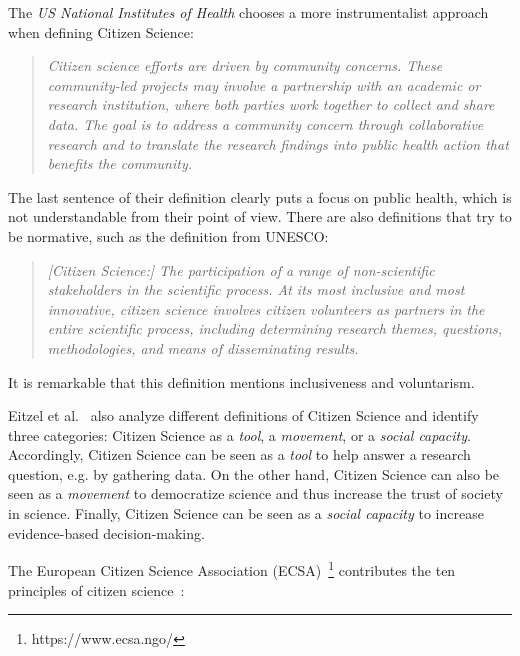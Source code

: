 The \textit{US National Institutes of Health} chooses a more instrumentalist approach when defining Citizen Science:
\begin{quote}
\textit{Citizen science efforts are driven by community concerns. These community-led projects may involve a partnership with an academic or research institution, where both parties work together to collect and share data. The goal is to address a community concern through collaborative research and to translate the research findings into public health action that benefits the community.}
\end{quote}
The last sentence of their definition clearly puts a focus on public health, which is not understandable from their point of view.
There are also definitions that try to be normative, such as the definition from UNESCO:
\begin{quote}
\textit{[Citizen Science:] The participation of a range of non-scientific stakeholders in the scientific process. At its most inclusive and most innovative, citizen science involves citizen volunteers as partners in the entire scientific process, including determining research themes, questions, methodologies, and means of disseminating results.}
\end{quote}
It is remarkable that this definition mentions inclusiveness and voluntarism.

Eitzel et al.~\cite{eitzel2017citizen} also analyze different definitions of Citizen Science and identify three categories: Citizen Science as a \textit{tool}, a \textit{movement}, or a \textit{social capacity}.
Accordingly, Citizen Science can be seen as a \textit{tool} to help answer a research question, e.g. by gathering data.
On the other hand, Citizen Science can also be seen as a \textit{movement} to democratize science and thus increase the trust of society in science.
Finally, Citizen Science can be seen as a \textit{social capacity} to increase evidence-based decision-making.

The European Citizen Science Association (ECSA)~\footnote{https://www.ecsa.ngo/} contributes the ten principles of citizen science~\cite{ecsa2015ten}:

